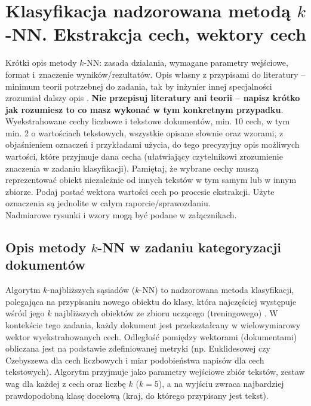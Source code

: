 \documentclass{article}
\begin{document}
\section{Klasyfikacja nadzorowana metodą $k$-NN.  Ekstrakcja cech, wektory cech}
Krótki opis metody $k$-NN: zasada działania, wymagane parametry wejściowe, format
i~znaczenie wyników/rezultatów. Opis własny z przypisami do literatury -- minimum
teorii potrzebnej do zadania, tak by inżynier innej specjalności zrozumiał dalszy
opis \cite{tadeusiewicz90}. {\bf Nie przepisuj literatury ani teorii -- napisz krótko jak
rozumiesz to co masz wykonać w tym konkretnym przypadku}.\\

Wyekstrahowane cechy liczbowe i tekstowe dokumentów, min. 10 cech, w tym min. 2
o wartościach tekstowych, wszystkie
opisane słownie oraz wzorami, z objaśnieniem oznaczeń i przykładami użycia, do
tego precyzyjny opis możliwych wartości, które przyjmuje dana cecha (ułatwiający
czytelnikowi zrozumienie znaczenia w zadaniu klasyfikacji). Pamiętaj, że wybrane
cechy muszą reprezentować obiekt niezależnie od innych tekstów w tym samym lub w
innym zbiorze. Podaj postać wektora wartości cech po procesie ekstrakcji. Użyte oznaczenia są jednolite w całym
raporcie/sprawozdaniu. \\
\indent Nadmiarowe rysunki i wzory mogą być podane w załącznikach. \\

\subsection{Opis metody $k$-NN w zadaniu kategoryzacji dokumentów}
Algorytm $k$-najbliższych sąsiadów ($k$-NN) to nadzorowana metoda klasyfikacji, polegająca na przypisaniu nowego obiektu do klasy, która najczęściej występuje wśród jego $k$ najbliższych obiektów ze zbioru uczącego (treningowego) \cite{tadeusiewicz90}. W kontekście tego zadania, każdy dokument jest przekształcany w wielowymiarowy wektor wyekstrahowanych cech.
Odległość pomiędzy wektorami (dokumentami) obliczana jest na podstawie zdefiniowanej metryki (np. Euklidesowej czy Czebyszewa dla cech liczbowych i miar podobieństwa napisów dla cech tekstowych). Algorytm przyjmuje jako parametry wejściowe zbiór tekstów, zestaw wag dla każdej z cech oraz liczbę $k$ ($k=5$), a na wyjściu zwraca najbardziej prawdopodobną klasę docelową (kraj, do którego przypisany jest tekst).
\end{document}
